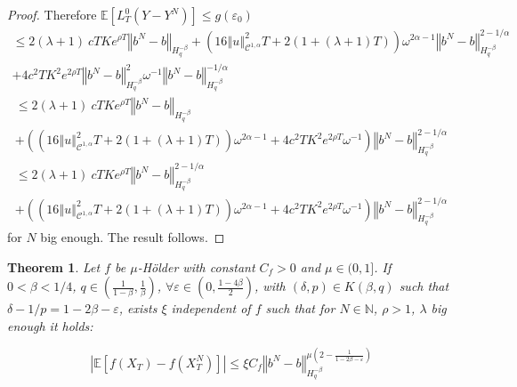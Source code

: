 \documentclass[12pt]{article}
\newtheorem{theo}{Theorem}
\newcommand{\norme}[1]{\left\Vert #1\right\Vert}
\newcommand{\N}{\mathbb{N}}
\newcommand{\E}{\mathbb{E}}
\begin{document}
\begin{proof}
    Therefore $
    \E\left[L^0_T(Y-Y^N)\right]\leq g(\varepsilon_0)
    $
    \begin{multline*}
    \leq 2(\lambda + 1)\ cT Ke^{\rho T}\norme{b^N-b}_{H^{-\beta}_{q}} +\left(16\norme{u}_{\mathcal{C}^{1,\alpha}}^2 T + 2(1+(\lambda + 1)T)\right) \omega^{2\alpha-1} \norme{b^N-b}_{H^{-\beta}_{q}}^{2-1/\alpha}\\+ 4c^2T K^2e^{2\rho T}\norme{b^N-b}_{H^{-\beta}_{q}}^2\omega^{-1}\norme{b^N-b}_{H^{-\beta}_{q}}^{-1/\alpha}
    \end{multline*}    
    \begin{multline*}
    \leq 2(\lambda + 1)\ cT Ke^{\rho T}\norme{b^N-b}_{H^{-\beta}_{q}} \\+\left(\left(16\norme{u}_{\mathcal{C}^{1,\alpha}}^2 T + 2(1+(\lambda + 1)T)\right) \omega^{2\alpha-1} + 4c^2T K^2e^{2\rho T}\omega^{-1}\right)\norme{b^N-b}_{H^{-\beta}_{q}}^{2-1/\alpha}
    \end{multline*}    
    \begin{multline*}
    \leq 2(\lambda + 1)\ cT Ke^{\rho T}\norme{b^N-b}_{H^{-\beta}_{q}}^{2-1/\alpha} \\+\left(\left(16\norme{u}_{\mathcal{C}^{1,\alpha}}^2 T + 2(1+(\lambda + 1)T)\right) \omega^{2\alpha-1} + 4c^2T K^2e^{2\rho T}\omega^{-1}\right)\norme{b^N-b}_{H^{-\beta}_{q}}^{2-1/\alpha}
    \end{multline*}
    for $N$ big enough. The result follows.
\end{proof}

\begin{theo}
    Let $f$ be $\mu$-Hölder with constant $C_f>0$ and $\mu\in(0,1]$. If $0<\beta < 1/4$, $q\in\left(\frac{1}{1-\beta},\frac{1}{\beta}\right)$, $\forall \varepsilon \in(0,\frac{1-4\beta}{2})$, with  $(\delta,p)\in K(\beta,q)$ such that $\delta - 1/p = 1-2\beta - \varepsilon$, exists $\xi$ independent of $f$ such that for $N\in\N$, $\rho>1$, $\lambda$ big enough it holds:
    
    \begin{equation*}
    \left|\E\left[f\left(X_T\right)-f\left(X_T^N\right)\right]\right| \leq \xi C_f \norme{b^N-b}_{H^{-\beta}_{q}}^{\mu\left(2-\frac{1}{1-2\beta-\varepsilon}\right)}
    \end{equation*}
\end{theo}
\end{document}
